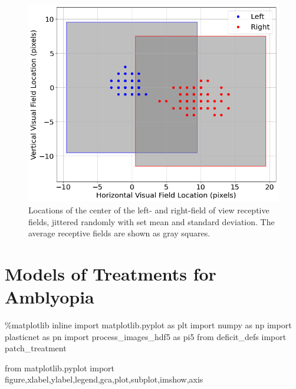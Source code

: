 \documentclass[
  letterpaper,
  DIV=11,
  numbers=noendperiod]{scrreprt}
\newenvironment{Shaded}{\begin{snugshade}}{\end{snugshade}}
\newcommand{\ImportTok}[1]{\textcolor[rgb]{0.00,0.46,0.62}{#1}}
\newcommand{\NormalTok}[1]{\textcolor[rgb]{0.00,0.23,0.31}{#1}}
\newcommand{\OperatorTok}[1]{\textcolor[rgb]{0.37,0.37,0.37}{#1}}
\begin{document}
\begin{figure}[H]

{\centering \includegraphics{./Deficit Models_files/figure-pdf/fig-jitter-input-locations-output-1.png}

}

\caption{\label{fig-jitter-input-locations}Locations of the center of
the left- and right-field of view receptive fields, jittered randomly
with set mean and standard deviation. The average receptive fields are
shown as gray squares.}

\end{figure}

\hypertarget{sec-models-of-treatments}{%
\chapter{Models of Treatments for
Amblyopia}\label{sec-models-of-treatments}}

\begin{Shaded}
\begin{Highlighting}[]
\OperatorTok{\%}\NormalTok{matplotlib inline}
\ImportTok{import}\NormalTok{ matplotlib.pyplot }\ImportTok{as}\NormalTok{ plt}
\ImportTok{import}\NormalTok{ numpy }\ImportTok{as}\NormalTok{ np}
\ImportTok{import}\NormalTok{ plasticnet }\ImportTok{as}\NormalTok{ pn}
\ImportTok{import}\NormalTok{ process\_images\_hdf5 }\ImportTok{as}\NormalTok{ pi5}
\ImportTok{from}\NormalTok{ deficit\_defs }\ImportTok{import}\NormalTok{ patch\_treatment}

\ImportTok{from}\NormalTok{ matplotlib.pyplot }\ImportTok{import}\NormalTok{ figure,xlabel,ylabel,legend,gca,plot,subplot,imshow,axis}
\end{Highlighting}
\end{Shaded}
\end{document}
